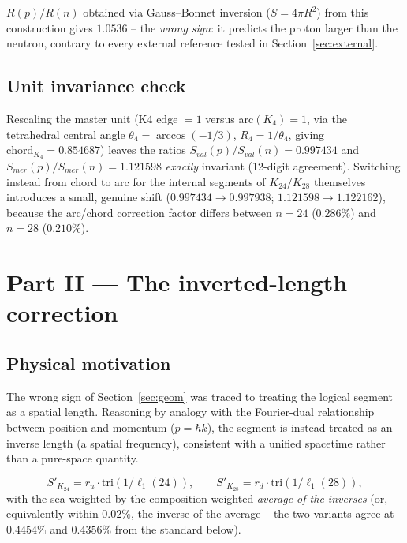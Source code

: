 \documentclass[11pt]{article}
\begin{document}
\begin{negativebox}
$R(p)/R(n)$ obtained via Gauss--Bonnet inversion ($S=4\pi R^2$) from this construction gives $1.0536$ -- the \emph{wrong sign}: it predicts the proton larger than the neutron, contrary to every external reference tested in Section~\ref{sec:external}.
\end{negativebox}

\subsection{Unit invariance check}
Rescaling the master unit (K4 edge $=1$ versus arc$(K_4)=1$, via the tetrahedral central angle $\theta_4=\arccos(-1/3)$, $R_4=1/\theta_4$, giving $\mathrm{chord}_{K_4}=0.854687$) leaves the ratios $S_{val}(p)/S_{val}(n)=0.997434$ and $S_{mer}(p)/S_{mer}(n)=1.121598$ \emph{exactly} invariant (12-digit agreement). Switching instead from chord to arc for the internal segments of $K_{24}/K_{28}$ themselves introduces a small, genuine shift ($0.997434\to0.997938$; $1.121598\to1.122162$), because the arc/chord correction factor differs between $n=24$ ($0.286\%$) and $n=28$ ($0.210\%$).

\section{Part II --- The inverted-length correction}
\label{sec:inverted}

\subsection{Physical motivation}
The wrong sign of Section~\ref{sec:geom} was traced to treating the logical segment as a spatial length. Reasoning by analogy with the Fourier-dual relationship between position and momentum ($p=\hbar k$), the segment is instead treated as an inverse length (a spatial frequency), consistent with a unified spacetime rather than a pure-space quantity.

\begin{equation}
S'_{K_{24}} = r_u\cdot\mathrm{tri}(1/\ell_1(24)), \qquad S'_{K_{28}} = r_d\cdot\mathrm{tri}(1/\ell_1(28)),
\end{equation}
with the sea weighted by the composition-weighted \emph{average of the inverses} (or, equivalently within $0.02\%$, the inverse of the average -- the two variants agree at $0.4454\%$ and $0.4356\%$ from the standard below).
\end{document}
